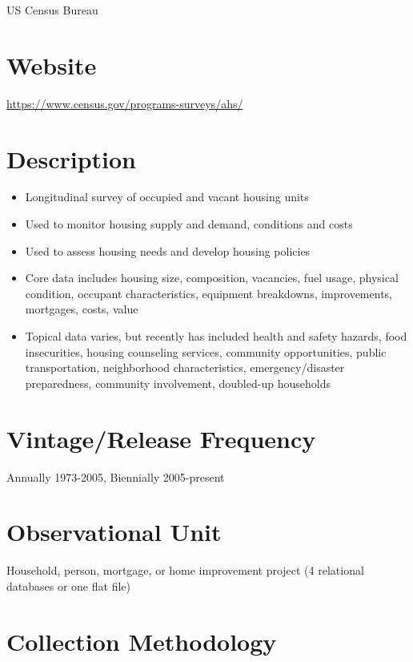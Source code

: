 \documentclass[
]{book}
\providecommand{\tightlist}{%
  \setlength{\itemsep}{0pt}\setlength{\parskip}{0pt}}
\begin{document}
US Census Bureau

\hypertarget{website-7}{%
\section{Website}\label{website-7}}

\url{https://www.census.gov/programs-surveys/ahs/}

\hypertarget{description-7}{%
\section{Description}\label{description-7}}

\begin{itemize}
\tightlist
\item
  Longitudinal survey of occupied and vacant housing units
\item
  Used to monitor housing supply and demand, conditions and costs
\item
  Used to assess housing needs and develop housing policies
\item
  Core data includes housing size, composition, vacancies, fuel usage, physical condition, occupant characteristics, equipment breakdowns, improvements, mortgages, costs, value
\item
  Topical data varies, but recently has included health and safety hazards, food insecurities, housing counseling services, community opportunities, public transportation, neighborhood characteristics, emergency/disaster preparedness, community involvement, doubled-up households
\end{itemize}

\hypertarget{vintagerelease-frequency-7}{%
\section{Vintage/Release Frequency}\label{vintagerelease-frequency-7}}

Annually 1973-2005, Biennially 2005-present

\hypertarget{observational-unit-7}{%
\section{Observational Unit}\label{observational-unit-7}}

Household, person, mortgage, or home improvement project (4 relational databases or one flat file)

\hypertarget{collection-methodology-7}{%
\section{Collection Methodology}\label{collection-methodology-7}}
\end{document}
